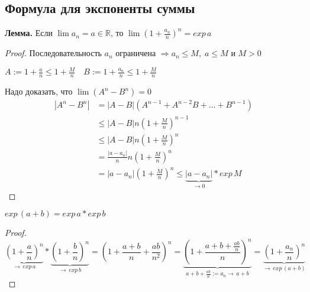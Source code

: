 \subsection{Формула для экспоненты суммы}
    \textbf{Лемма.}
        Если $\lim a_n = a \in \mathbb{R}$, то $\lim (1 + \frac{a_n}{n})^n = exp\,a$    
    \begin{proof}
        Последовательность $a_n$ ограничена $\Rightarrow a_n \leqslant M,\; a \leqslant M$ и $M > 0$
        
        $A := 1 + \frac{a}{n} \leqslant 1 + \frac{M}{n} \quad B:= 1 + \frac{a_n}{n} \leqslant 1 + \frac{M}{n}$
        
        Надо доказать, что $\lim(A^n - B^n) = 0$
        \begin{equation*}
            \begin{split}
                |A^n - B^n| &= |A - B|(A^{n-1} + A^{n-2}B + \dots + B^{n-1}) \\ &\leqslant |A-B|n(1 + \frac{M}{n})^{n-1} \\
                &\leqslant |A-B|n(1 + \frac{M}{n})^n \\ 
                &= \frac{|a-a_n|}{n}n(1 + \frac{M}{n})^n \\
                &= |a - a_n|(1 + \frac{M}{n})^n \leqslant \underbrace{|a-a_n|}_{\to 0}*exp\,M
            \end{split}
        \end{equation*}
    \end{proof}
    \begin{theorem-non}
        $exp\,(a+b) = exp\,a * exp\,b$
    \end{theorem-non}
    \begin{proof}
        \[ \underbrace{(1 + \frac{a}{n})^n}_{\to\,exp\,a} * \underbrace{(1 + \frac{b}{n})^n}_{\to\,exp\,b} = (1 + \frac{a+b}{n} + \frac{ab}{n^2})^n = \underbrace{(1 + \frac{a + b + \frac{ab}{n}}{n})^n}_{a + b + \frac{ab}{n} := a_n \to\,a + b} = \underbrace{(1 + \frac{a_n}{n})^n}_{\to\,exp\,(a+b)} \]
    \end{proof}